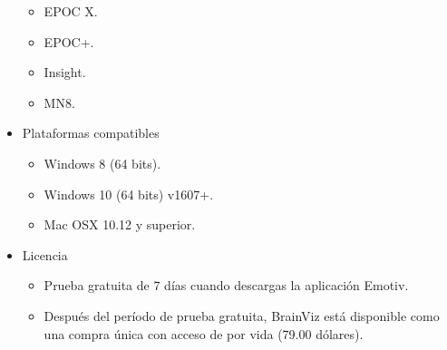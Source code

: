 \begin{itemize}
\begin{itemize}
        \item EPOC X.
        \item EPOC+.
        \item Insight.
        \item MN8.
    \end{itemize}
    \item Plataformas compatibles
    \begin{itemize}
        \item Windows 8 (64 bits).
        \item Windows 10 (64 bits) v1607+.
        \item Mac OSX 10.12 y superior.
    \end{itemize}
    \item Licencia
    \begin{itemize}
        \item Prueba gratuita de 7 días cuando descargas la aplicación Emotiv.
        \item Después del período de prueba gratuita, BrainViz está disponible como una compra única con acceso de por vida (79.00 dólares).
    \end{itemize}
\end{itemize}

